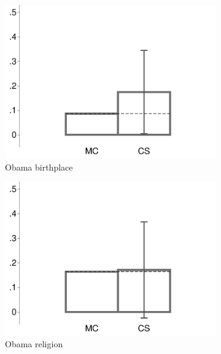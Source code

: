 \begin{figure}[t]
	\caption{Confidence Scoring vs. IMC (MTurk 1)}	
	\centering
	\begin{subfigure}{.325\textwidth}\centering
		\includegraphics[width=\textwidth]{../figs/confidence_score_ccd_imc_14k_birth_study1.pdf}
		\caption{Obama birthplace}
	\end{subfigure}
	\hfill
	\begin{subfigure}{.325\textwidth}\centering
		\includegraphics[width=\textwidth]{../figs/confidence_score_ccd_imc_14k_religion_study1.pdf}
		\caption{Obama religion}
	\end{subfigure}	
	\hfill
	\begin{subfigure}{.325\textwidth}\centering

\end{subfigure}
\end{figure}

